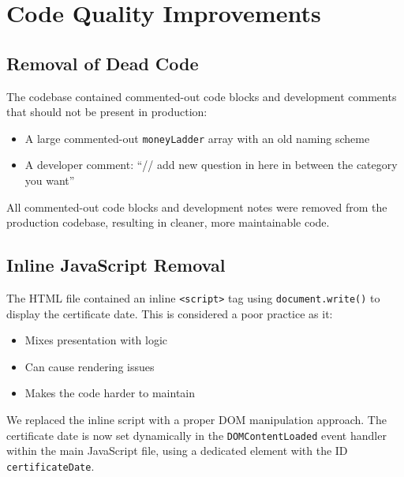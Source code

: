 \documentclass[11pt,a4paper]{article}
\begin{document}
\section{Code Quality Improvements}

\subsection{Removal of Dead Code}

\begin{issuebox}
The codebase contained commented-out code blocks and development comments that should not be present in production:
\begin{itemize}
    \item A large commented-out \texttt{moneyLadder} array with an old naming scheme
    \item A developer comment: ``// add new question in here in between the category you want''
\end{itemize}
\end{issuebox}

\begin{fixbox}
All commented-out code blocks and development notes were removed from the production codebase, resulting in cleaner, more maintainable code.
\end{fixbox}

\subsection{Inline JavaScript Removal}

\begin{issuebox}
The HTML file contained an inline \texttt{<script>} tag using \texttt{document.write()} to display the certificate date. This is considered a poor practice as it:
\begin{itemize}
    \item Mixes presentation with logic
    \item Can cause rendering issues
    \item Makes the code harder to maintain
\end{itemize}
\end{issuebox}

\begin{fixbox}
We replaced the inline script with a proper DOM manipulation approach. The certificate date is now set dynamically in the \texttt{DOMContentLoaded} event handler within the main JavaScript file, using a dedicated element with the ID \texttt{certificateDate}.
\end{fixbox}
\end{document}
